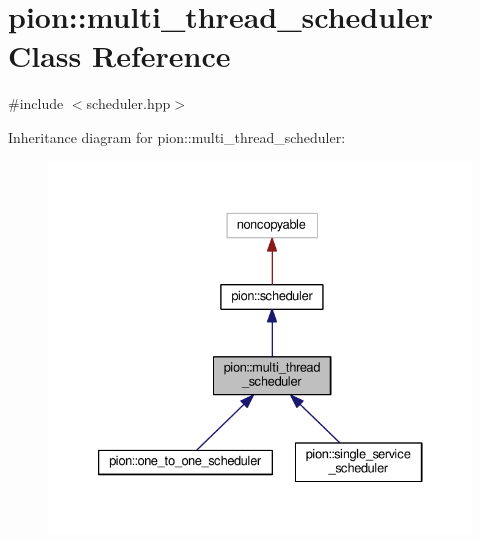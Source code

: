 \hypertarget{classpion_1_1multi__thread__scheduler}{\section{pion\-:\-:multi\-\_\-thread\-\_\-scheduler Class Reference}
\label{classpion_1_1multi__thread__scheduler}
}


{\ttfamily \#include $<$scheduler.\-hpp$>$}



Inheritance diagram for pion\-:\-:multi\-\_\-thread\-\_\-scheduler\-:
\nopagebreak
\begin{figure}[H]
\begin{center}
\leavevmode
\includegraphics[width=333pt]{classpion_1_1multi__thread__scheduler__inherit__graph}
\end{center}
\end{figure}


